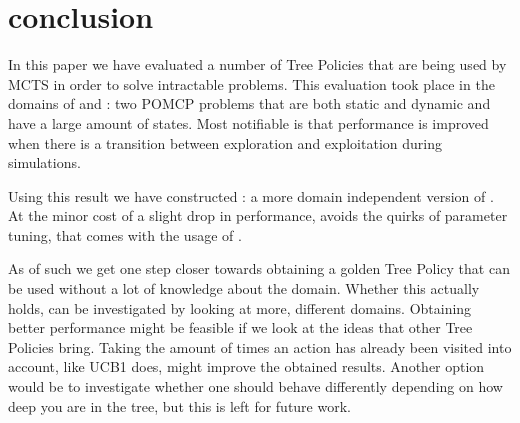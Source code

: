 \section{conclusion}
In this paper we have evaluated a number of Tree Policies that are being used by MCTS in order to solve intractable problems. This evaluation took place in the domains of \rock and \poc: two POMCP problems that are both static and dynamic and have a large amount of states. Most notifiable is that performance is improved when there is a transition between exploration and exploitation during simulations. 

Using this result we have constructed \rsoft: a more domain independent version of \soft. At the minor cost of a slight drop in performance, \rsoft avoids the quirks of parameter tuning, that comes with the usage of \soft. 

As of such we get one step closer towards obtaining a golden Tree Policy that can be used without a lot of knowledge about the domain. Whether this actually holds, can be investigated by looking at more, different domains. Obtaining better performance might be feasible if we look at the ideas that other Tree Policies bring. Taking the amount of times an action has already been visited into account, like UCB1 does, might improve the obtained results. Another option would be to investigate whether one should behave differently depending on how deep you are in the tree, but this is left for future work.